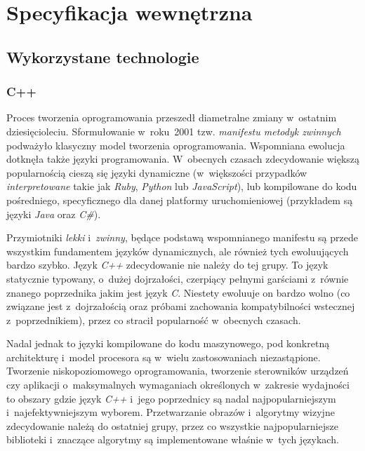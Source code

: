 \chapter{Specyfikacja wewnętrzna}\label{Chapter_SpecyfikacjaWewnetrzna}

  \section{Wykorzystane technologie}\label{Section_Technologie}

    \subsection{C++}\label{Subsection_Cpp}

      Proces tworzenia oprogramowania przeszedł diametralne zmiany w~ostatnim dziesięcioleciu. Sformułowanie w~roku~2001 tzw. \textit{manifestu metodyk zwinnych} podważyło klasyczny model tworzenia oprogramowania. Wspomniana ewolucja dotknęła także języki programowania. W~obecnych czasach zdecydowanie większą popularnością cieszą się języki dynamiczne (w~większości przypadków \textit{interpretowane} takie jak \textit{Ruby}, \textit{Python} lub \textit{JavaScript}), lub kompilowane do kodu pośredniego, specyficznego dla danej platformy uruchomieniowej (przykładem są języki \textit{Java} oraz \textit{C\#}).

      Przymiotniki \textit{lekki} i~\textit{zwinny}, będące podstawą wspomnianego manifestu są przede wszystkim fundamentem języków dynamicznych, ale również tych ewoluujących bardzo szybko. Język \textit{C++} zdecydowanie nie należy do tej grupy. To język statycznie typowany, o~dużej dojrzałości, czerpiący pełnymi garściami z~równie znanego poprzednika jakim jest język \textit{C}. Niestety ewoluuje on bardzo wolno (co związane jest z~dojrzałością oraz próbami zachowania kompatybilności wstecznej z~poprzednikiem), przez co stracił popularność w~obecnych czasach.

      Nadal jednak to języki kompilowane do kodu maszynowego, pod konkretną architekturę i~model procesora są w~wielu zastosowaniach niezastąpione. Tworzenie niskopoziomowego oprogramowania, tworzenie sterowników urządzeń czy aplikacji o~maksymalnych wymaganiach określonych w~zakresie wydajności to obszary gdzie język \textit{C++} i~jego poprzednicy są nadal najpopularniejszym i~najefektywniejszym wyborem. Przetwarzanie obrazów i~algorytmy wizyjne zdecydowanie należą do ostatniej grupy, przez co wszystkie najpopularniejsze biblioteki i~znaczące algorytmy są implementowane właśnie w~tych językach.

